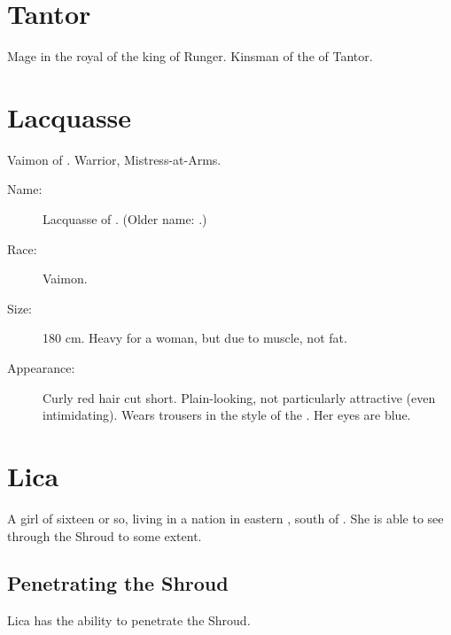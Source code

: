 \section{\Jirad Tantor}
Mage in the royal \ishrah{} of the king of Runger. 
Kinsman of the \scarv{} of Tantor. 















\section{\Laetitia Lacquasse}
Vaimon of \ClanRedcor. Warrior, Mistress-at-Arms. 

\begin{description}
  \item[Name:] 
    \Ryzin{} \Laetitia{} Lacquasse of \ClanRedcor. 
    (Older name: \Brizen{}.)
  \item[Race:] Vaimon. 
  \item[Size:] 180 cm. Heavy for a woman, but due to muscle, not fat. 
  \item[Appearance:] Curly red hair cut short. Plain-looking, not particularly attractive (even intimidating). Wears trousers in the style of the \Ryzin. Her eyes are blue. 
\end{description}
















\section{Lica}
A \human{} girl of sixteen or so, living in a nation in eastern \Velcad{}, south of \Redce. 
She is able to see through the Shroud to some extent. 









\subsection{Penetrating the Shroud}
Lica has the ability to penetrate the Shroud. 





